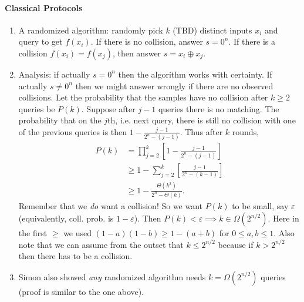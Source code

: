 \paragraph{Classical Protocols}
\begin{enumerate}
    \item A randomized algorithm: randomly pick $k$ (TBD) distinct inputs $x_i$ and query to get $f(x_i)$. If there is no collision, answer $s=0^n$. If there is a collision $f(x_i)=f(x_j)$, then answer $s=x_i \oplus x_j$. 
    
    \item Analysis: if actually $s=0^n$ then the algorithm works with certainty. If actually $s \neq 0^n$ then we might answer wrongly if there are no observed collisions. Let the probability that the samples have no collision after $k\geq 2$ queries be $P(k)$. Suppose after $j-1$ queries there is no matching. The probability that on the $j$th, i.e. next query, there is still no collision with one of the previous queries is then $1-\frac{j-1}{2^n-(j-1)}$. Thus after $k$ rounds,
    \begin{align*}
        P(k) &= \prod_{j=2}^k \left[ 1- \frac{j-1}{2^n-(j-1)} \right]\\
        &\geq 1-\sum_{j=2}^k \left[ \frac{j-1}{2^n-(k-1)} \right]\\
        &\geq 1- \frac{\Theta(k^2)}{2^n-\Theta(k)}.
    \end{align*}
    Remember that we \textit{do} want a collision! So we want $P(k)$ to be small, say $\varepsilon$ (equivalently, coll. prob. is $1-\varepsilon$). Then $P(k)<\varepsilon \implies k \in \Omega(2^{n/2})$. Here in the first $\geq$ we used $(1-a)(1-b)\geq 1-(a+b)$ for $0\leq a,b \leq 1$. Also note that we can assume from the outset that $k\leq 2^{n/2}$ because if $k>2^{n/2}$ then there has to be a collision.
    
    \item Simon also showed \textit{any} randomized algorithm needs $k=\Omega(2^{n/2})$ queries (proof is similar to the one above).
\end{enumerate}
    
